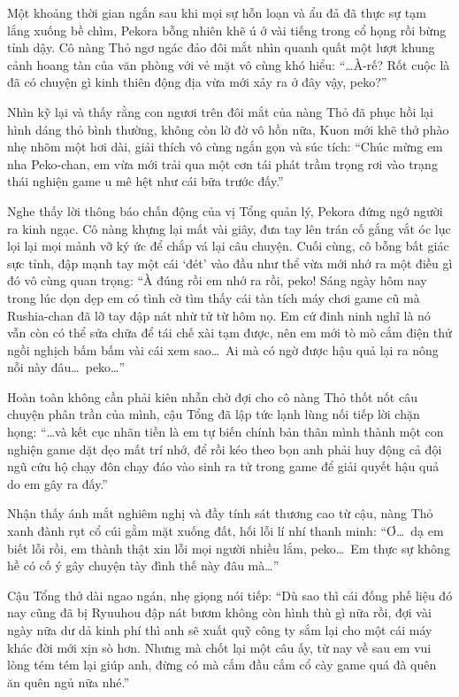 \documentclass[../main.tex]{subfiles}
\begin{document}
\ct

Một khoảng thời gian ngắn sau khi mọi sự hỗn loạn và ẩu đả đã thực sự tạm lắng xuống bề chìm, Pekora bỗng nhiên khẽ ú ớ vài tiếng trong cổ họng rồi bừng tỉnh dậy. Cô nàng Thỏ ngơ ngác đảo đôi mắt nhìn quanh quất một lượt khung cảnh hoang tàn của văn phòng với vẻ mặt vô cùng khó hiểu: ``\dots À-rế? Rốt cuộc là đã có chuyện gì kinh thiên động địa vừa mới xảy ra ở đây vậy, peko?''

Nhìn kỹ lại và thấy rằng con ngươi trên đôi mắt của nàng Thỏ đã phục hồi lại hình dáng thỏ bình thường, không còn lờ đờ vô hồn nữa, Kuon mới khẽ thở phào nhẹ nhõm một hơi dài, giải thích vô cùng ngắn gọn và súc tích: ``Chúc mừng em nha Peko-chan, em vừa mới trải qua một cơn tái phát trầm trọng rơi vào trạng thái nghiện game u mê hệt như cái bữa trước đấy.''

Nghe thấy lời thông báo chấn động của vị Tổng quản lý, Pekora đứng ngớ người ra kinh ngạc. Cô nàng khựng lại mất vài giây, đưa tay lên trán cố gắng vắt óc lục lọi lại mọi mảnh vỡ ký ức để chắp vá lại câu chuyện. Cuối cùng, cô bỗng bất giác sực tỉnh, đập mạnh tay một cái `đét' vào đầu như thể vừa mới nhớ ra một điều gì đó vô cùng quan trọng: ``À đúng rồi em nhớ ra rồi, peko! Sáng ngày hôm nay trong lúc dọn dẹp em có tình cờ tìm thấy cái tàn tích máy chơi game cũ mà Rushia-chan đã lỡ tay đập nát nhừ tử từ hôm nọ. Em cứ đinh ninh nghĩ là nó vẫn còn có thể sửa chữa để tái chế xài tạm được, nên em mới tò mò cắm điện thử ngồi nghịch bấm bấm vài cái xem sao\dots\ Ai mà có ngờ được hậu quả lại ra nông nỗi này đâu\dots\ peko\dots''

Hoàn toàn không cần phải kiên nhẫn chờ đợi cho cô nàng Thỏ thốt nốt câu chuyện phân trần của mình, cậu Tổng đã lập tức lạnh lùng nối tiếp lời chặn họng: ``\dots và kết cục nhãn tiền là em tự biến chính bản thân mình thành một con nghiện game dặt dẹo mất trí nhớ, để rồi kéo theo bọn anh phải huy động cả đội ngũ cứu hộ chạy đôn chạy đáo vào sinh ra tử trong game để giải quyết hậu quả do em gây ra đấy.''

Nhận thấy ánh mắt nghiêm nghị và đầy tính sát thương cao từ cậu, nàng Thỏ xanh đành rụt cổ cúi gằm mặt xuống đất, hối lỗi lí nhí thanh minh: ``Ơ\dots\ dạ em biết lỗi rồi, em thành thật xin lỗi mọi người nhiều lắm, peko\dots\ Em thực sự không hề có cố ý gây chuyện tày đình thế này đâu mà\dots''

Cậu Tổng thở dài ngao ngán, nhẹ giọng nói tiếp: ``Dù sao thì cái đống phế liệu đó nay cũng đã bị Ryuuhou đập nát bươm không còn hình thù gì nữa rồi, đợi vài ngày nữa dư dả kinh phí thì anh sẽ xuất quỹ công ty sắm lại cho một cái máy khác đời mới xịn sò hơn. Nhưng mà chốt lại một câu ấy, từ nay về sau em vui lòng tém tém lại giúp anh, đừng có mà cắm đầu cắm cổ cày game quá đà quên ăn quên ngủ nữa nhé.''
\end{document}

